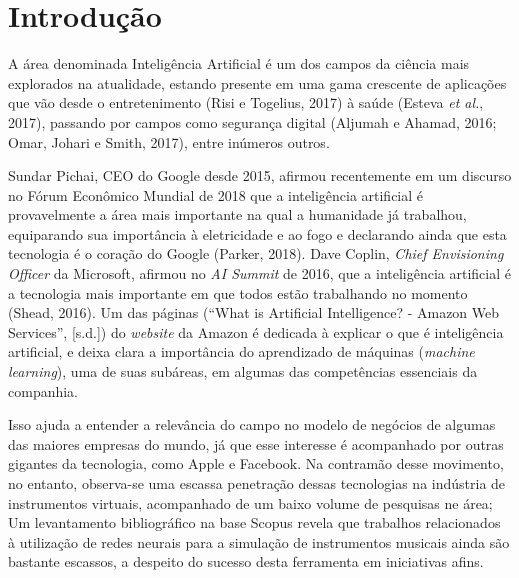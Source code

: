 \documentclass[]{article}
\date{}
\begin{document}
\renewcommand{\tablename}{Tabela}

\renewcommand{\figurename}{Figura}

\newcommand{\plusnamesingular}{}
\newcommand{\starnamesingular}{}
\newcommand{\xrefname}[1]{\protect\renewcommand{\plusnamesingular}{#1}}
\newcommand{\Xrefname}[1]{\protect\renewcommand{\starnamesingular}{#1}}
\providecommand{\cref}{\plusnamesingular~\ref}
\providecommand{\Cref}{\starnamesingular~\ref}
\providecommand{\crefformat}[2]{}
\providecommand{\Crefformat}[2]{}

\crefformat{figure}{figura~#2#1#3}
\Crefformat{figure}{Figure~#2#1#3}
\crefformat{table}{tabela~#2#1#3}
\Crefformat{table}{Table~#2#1#3}
\crefformat{equation}{equação~#2#1#3}
\Crefformat{equation}{Equation~#2#1#3}

\hypertarget{introduuxe7uxe3o}{%
\section{Introdução}\label{introduuxe7uxe3o}}

A área denominada Inteligência Artificial é um dos campos da ciência
mais explorados na atualidade, estando presente em uma gama crescente de
aplicações que vão desde o entretenimento (Risi e Togelius, 2017) à
saúde (Esteva \emph{et al.}, 2017), passando por campos como segurança
digital (Aljumah e Ahamad, 2016; Omar, Johari e Smith, 2017), entre
inúmeros outros.

Sundar Pichai, CEO do Google desde 2015, afirmou recentemente em um
discurso no Fórum Econômico Mundial de 2018 que a inteligência
artificial é provavelmente a área mais importante na qual a humanidade
já trabalhou, equiparando sua importância à eletricidade e ao fogo e
declarando ainda que esta tecnologia é o coração do Google (Parker,
2018). Dave Coplin, \emph{Chief Envisioning Officer} da Microsoft,
afirmou no \emph{AI Summit} de 2016, que a inteligência artificial é a
tecnologia mais importante em que todos estão trabalhando no momento
(Shead, 2016). Um das páginas (``What is Artificial Intelligence? -
Amazon Web Services'', {[}s.d.{]}) do \emph{website} da Amazon é
dedicada à explicar o que é inteligência artificial, e deixa clara a
importância do aprendizado de máquinas (\emph{machine learning}), uma de
suas subáreas, em algumas das competências essenciais da companhia.

Isso ajuda a entender a relevância do campo no modelo de negócios de
algumas das maiores empresas do mundo, já que esse interesse é
acompanhado por outras gigantes da tecnologia, como Apple e Facebook. Na
contramão desse movimento, no entanto, observa-se uma escassa penetração
dessas tecnologias na indústria de instrumentos virtuais, acompanhado de
um baixo volume de pesquisas ne área; Um levantamento bibliográfico na
base Scopus revela que trabalhos relacionados à utilização de redes
neurais para a simulação de instrumentos musicais ainda são bastante
escassos, a despeito do sucesso desta ferramenta em iniciativas afins.
\end{document}
